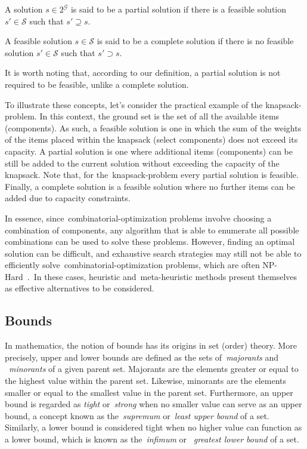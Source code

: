 \begin{definition}
  \label{def:partial-solution} A solution $s \in 2^\mathcal{G}$ is said to be a
  partial solution if there is a feasible solution $s' \in \mathcal{S}$ such
  that $s' \supseteq s$.
\end{definition}

\begin{definition}
  \label{def:complete-solution} A feasible solution $s \in \mathcal{S}$ is said
  to be a complete solution if there is no feasible solution $s' \in
    \mathcal{S}$ such that $s' \supset s$.
\end{definition}

It is worth noting that, according to our definition, a partial solution is not
required to be feasible, unlike a complete solution.

To illustrate these concepts, let's consider the practical example of the
\acrshort{knapsack-problem}. In this context, the ground set is the set of all
the available items (components). As such, a feasible solution is one in which
the sum of the weights of the items placed within the knapsack (select
components) does not exceed its capacity. A partial solution is one where
additional items (components) can be still be added to the current solution
without exceeding the capacity of the knapsack. Note that, for
the~\acrshort{knapsack-problem} every partial solution is feasible. Finally, a
complete solution is a feasible solution where no further items can be added due
to capacity constraints.

In essence, since~\acrshort{combinatorial-optimization} problems involve
choosing a combination of components, any algorithm that is able to enumerate
all possible combinations can be used to solve these problems. However, finding
an optimal solution can be difficult, and exhaustive search strategies may still
not be able to efficiently solve~\acrshort{combinatorial-optimization} problems,
which are often NP-Hard~\cite{yu2010combinatorial,festa2014brief}.~In
these cases, heuristic and~\acrshort{meta-heuristic} methods present themselves
as effective alternatives to be considered.

\subsection{Bounds}
\label{subsec:bounds}

In mathematics, the notion of bounds has its origins in set (order) theory. More
precisely, upper and lower bounds are defined as the sets of~\textit{majorants}
and ~\textit{minorants} of a given parent set. Majorants are the
elements greater or equal to the highest value within the parent set.
Likewise, minorants are the elements smaller or equal to the smallest
value in the parent set. Furthermore, an upper bound is regarded as
\textit{tight} or~\textit{strong} when no smaller value can serve as an upper
bound, a concept known as the~\textit{supremum} or~\textit{least upper bound} of
a set. Similarly, a lower bound is considered tight when no higher value can
function as a lower bound, which is known as the~\textit{infimum} or
~\textit{greatest lower bound} of a set.

